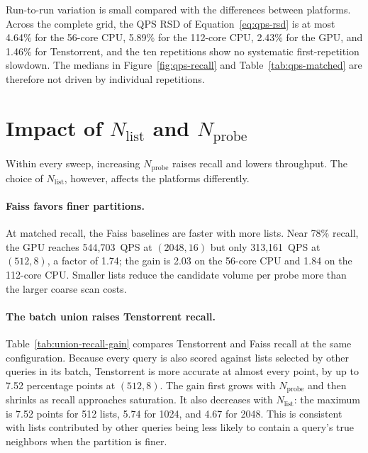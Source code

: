 Run-to-run variation is small compared with the differences between
platforms. Across the complete grid, the QPS RSD of
Equation~\ref{eq:qps-rsd} is at most 4.64\% for the 56-core CPU, 5.89\% for
the 112-core CPU, 2.43\% for the GPU, and 1.46\% for Tenstorrent, and the
ten repetitions show no systematic first-repetition slowdown. The medians in
Figure~\ref{fig:qps-recall} and Table~\ref{tab:qps-matched} are therefore
not driven by individual repetitions.

\section{Impact of \texorpdfstring{\(N_{\mathrm{list}}\) and
\(N_{\mathrm{probe}}\)}{Nlist and Nprobe}}
\label{sec:nlist-nprobe-results}

Within every sweep, increasing \(N_{\mathrm{probe}}\) raises recall and lowers
throughput. The choice of \(N_{\mathrm{list}}\), however, affects the platforms
differently.

\paragraph{Faiss favors finer partitions.}
At matched recall, the Faiss baselines are faster with more lists. Near 78\%
recall, the GPU reaches 544,703~QPS at \((2048,16)\) but only 313,161~QPS at
\((512,8)\), a factor of 1.74; the gain is 2.03 on the 56-core CPU and 1.84 on the
112-core CPU.
Smaller lists reduce the candidate volume per probe more than the larger
coarse scan costs.

\paragraph{The batch union raises Tenstorrent recall.}
Table~\ref{tab:union-recall-gain} compares Tenstorrent and Faiss recall at the
same configuration. Because every query is also scored against lists selected
by other queries in its batch, Tenstorrent is more accurate at almost every
point, by up to 7.52 percentage points at \((512,8)\). The gain first grows
with \(N_{\mathrm{probe}}\) and then shrinks as recall approaches saturation.
It also decreases with \(N_{\mathrm{list}}\): the maximum is 7.52 points for
512 lists, 5.74 for 1024, and 4.67 for 2048. This is consistent with lists
contributed by other queries being less likely to contain a query's true
neighbors when the partition is finer.

